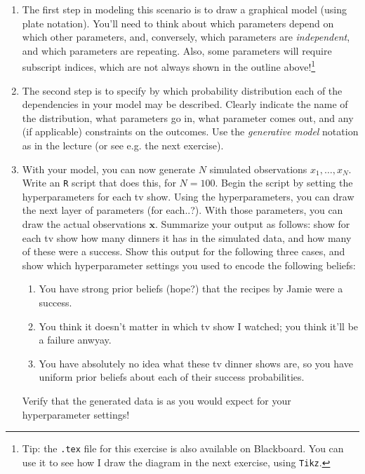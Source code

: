 \documentclass[a4paper]{article}
\renewcommand{\v}[1]{\mathbf{\bm #1}}
\begin{document}
\begin{enumerate}
    \item The first step in modeling this scenario is to draw a graphical model (using plate notation). You'll need to think about which parameters depend on which other parameters, and, conversely, which parameters are \emph{independent}, and which parameters are repeating. Also, some parameters will require subscript indices, which are not always shown in the outline above!\footnote{Tip: the \texttt{.tex} file for this exercise is also available on Blackboard. You can use it to see how I draw the diagram in the next exercise, using \texttt{Tikz}.}
    
    \item The second step is to specify by which probability distribution each of the dependencies in your model may be described. Clearly indicate the name of the distribution, what parameters go in, what parameter comes out, and any (if applicable) constraints on the outcomes. Use the \emph{generative model} notation as in the lecture (or see e.g. the next exercise).
    
    \item With your model, you can now generate $N$ simulated observations $x_1,\ldots,x_N$. Write an \texttt{R} script that does this, for $N=100$. Begin the script by setting the hyperparameters for each tv show. Using the hyperparameters, you can draw the next layer of parameters (for each..?). With those parameters, you can draw the actual observations $\v{x}$. Summarize your output as follows: show for each tv show how many dinners it has in the simulated data, and how many of these were a success. Show this output for the following three cases, and show which hyperparameter settings you used to encode the following beliefs:
        \begin{enumerate}
          \item You have strong prior beliefs (hope?) that the recipes by Jamie were a success.
          \item You think it doesn't matter in which tv show I watched; you think it'll be a failure anwyay. 
          \item You have absolutely no idea what these tv dinner shows are, so you have uniform prior beliefs about each of their success probabilities.
        \end{enumerate}
        Verify that the generated data is as you would expect for your hyperparameter settings!
\end{enumerate}
\end{document}
